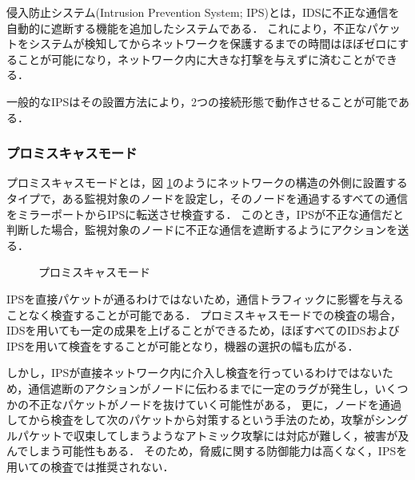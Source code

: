 侵入防止システム(Intrusion Prevention System; IPS)とは，IDSに不正な通信を自動的に遮断する機能を追加したシステムである．
これにより，不正なパケットをシステムが検知してからネットワークを保護するまでの時間はほぼゼロにすることが可能になり，ネットワーク内に大きな打撃を与えずに済むことができる．

一般的なIPSはその設置方法により，2つの接続形態で動作させることが可能である．

\subsubsection{プロミスキャスモード}

プロミスキャスモードとは，図 \ref{fig:2-1}のようにネットワークの構造の外側に設置するタイプで，ある監視対象のノードを設定し，そのノードを通過するすべての通信をミラーポートからIPSに転送させ検査する\cite{ciscoips}．
このとき，IPSが不正な通信だと判断した場合，監視対象のノードに不正な通信を遮断するようにアクションを送る．

\begin{figure}[tb]
	\begin{center}
		\caption{プロミスキャスモード}
		\label{fig:2-1}
	\end{center}
\end{figure}

IPSを直接パケットが通るわけではないため，通信トラフィックに影響を与えることなく検査することが可能である．
プロミスキャスモードでの検査の場合，IDSを用いても一定の成果を上げることができるため，ほぼすべてのIDSおよびIPSを用いて検査をすることが可能となり，機器の選択の幅も広がる．

しかし，IPSが直接ネットワーク内に介入し検査を行っているわけではないため，通信遮断のアクションがノードに伝わるまでに一定のラグが発生し，いくつかの不正なパケットがノードを抜けていく可能性がある，
更に，ノードを通過してから検査をして次のパケットから対策するという手法のため，攻撃がシングルパケットで収束してしまうようなアトミック攻撃には対応が難しく，被害が及んでしまう可能性もある．
そのため，脅威に関する防御能力は高くなく，IPSを用いての検査では推奨されない．

